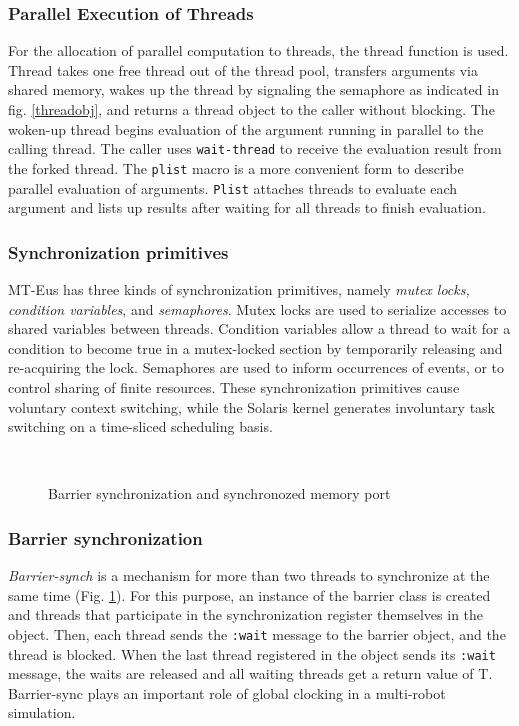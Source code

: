 \subsubsection{Parallel Execution of Threads}
For the allocation of parallel computation to threads, the thread function
is used.
Thread takes one free thread out of the thread pool,
transfers arguments via shared memory, wakes up the thread by signaling
the semaphore as indicated in fig. \ref{threadobj},
and returns a thread object to the caller without blocking.
The woken-up thread begins evaluation of
the argument running in parallel to the calling thread.
The caller uses
{\tt wait-thread} to receive the evaluation result from the forked thread.
The {\tt plist} macro is a more convenient form to describe parallel 
evaluation of arguments.
{\tt Plist} attaches threads to evaluate each argument
and lists up results after waiting for all threads to finish evaluation.

\subsubsection{Synchronization primitives}
MT-Eus has three kinds of synchronization primitives,
namely {\em mutex locks, condition variables}, and {\em semaphores}.
Mutex locks  are used to serialize accesses to shared variables
between threads.
Condition variables allow a thread to wait for a condition to become
true in a mutex-locked section by temporarily releasing and re-acquiring 
the lock.
Semaphores are used to inform occurrences of events, or to control
sharing of finite resources.
These synchronization primitives cause voluntary context switching,
while the Solaris kernel generates involuntary task switching
on a time-sliced scheduling basis.

\begin{figure}
\begin{center}
\mbox{
\epsfsize=10cm
}
\caption{Barrier synchronization and synchronozed memory port}
\label{synchports}
\end{center}
\end{figure}

\subsubsection{Barrier synchronization}
{\em Barrier-synch} is a mechanism for more than two threads to synchronize
at the same time (Fig. \ref{synchports}).
For this purpose, an instance of the barrier class
is created and threads that participate in
the synchronization register themselves in the object.
Then, each thread sends the {\tt :wait} message to the barrier object,
and the thread is blocked.
When the last thread registered in the object sends its
{\tt :wait} message, the waits are released and all waiting
threads get a return value of T.
Barrier-sync plays an important role of global clocking in a
multi-robot simulation.

